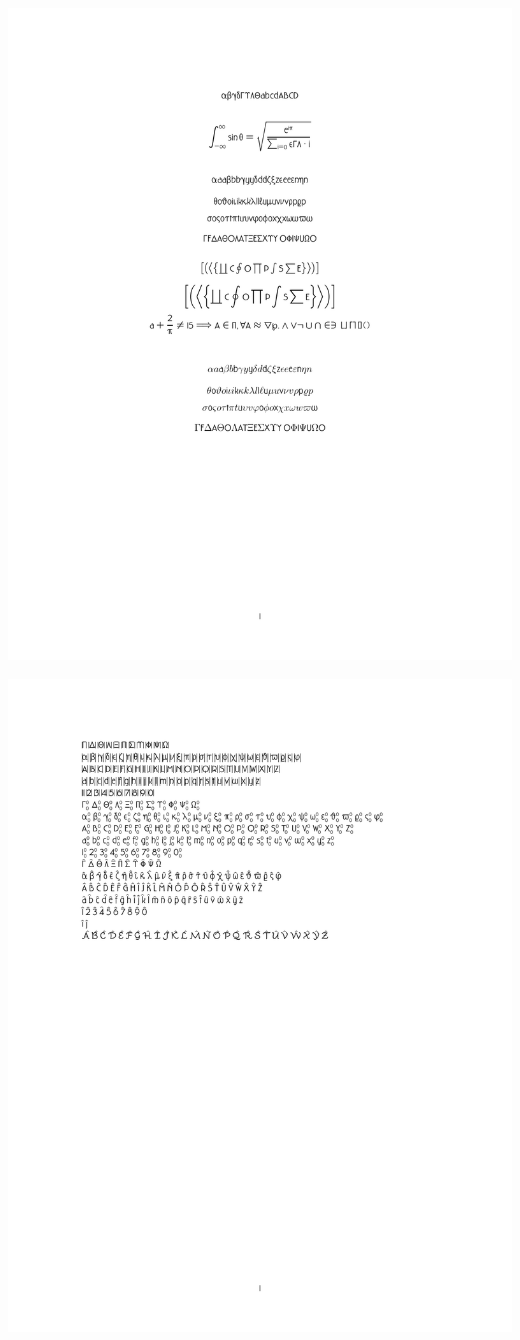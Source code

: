 \documentclass[twocolumn]{article}
\begin{document}
 \noindent\includegraphics*{../results/hardwood-font}\par
{} \noindent\includegraphics*{../results/hardwood-pos}\par
\end{document}
